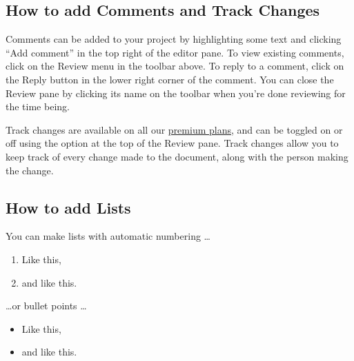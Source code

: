 \documentclass{article}
\begin{document}
\subsection{How to add Comments and Track Changes}

Comments can be added to your project by highlighting some text and clicking ``Add comment'' in the top right of the editor pane. To view existing comments, click on the Review menu in the toolbar above. To reply to a comment, click on the Reply button in the lower right corner of the comment. You can close the Review pane by clicking its name on the toolbar when you're done reviewing for the time being.

Track changes are available on all our \href{https://www.overleaf.com/user/subscription/plans}{premium plans}, and can be toggled on or off using the option at the top of the Review pane. Track changes allow you to keep track of every change made to the document, along with the person making the change. 

\subsection{How to add Lists}

You can make lists with automatic numbering \dots

\begin{enumerate}
\item Like this,
\item and like this.
\end{enumerate}
\dots or bullet points \dots
\begin{itemize}
\item Like this,
\item and like this.
\end{itemize}
\end{document}
